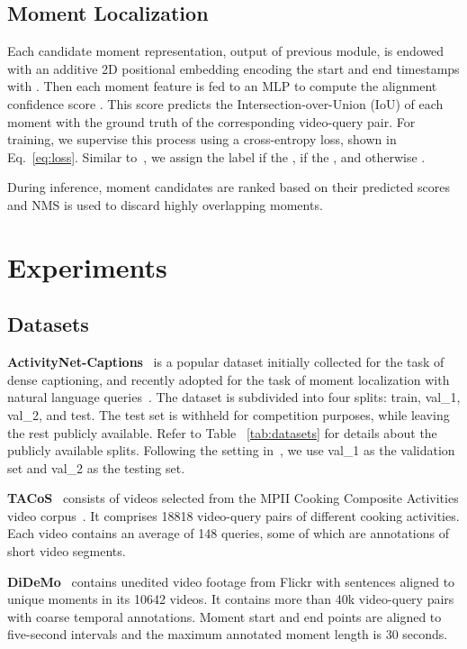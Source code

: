 \documentclass[10pt,twocolumn,letterpaper]{article}
\begin{document}
\subsection{Moment Localization}\label{subsec: Loc}
Each candidate moment representation, output of previous module, is endowed with an additive 2D positional embedding encoding the start and end timestamps  with . Then each moment feature is fed to an MLP to compute the alignment confidence score . This score predicts the Intersection-over-Union (IoU) of each moment with the ground truth of the corresponding video-query pair. For training, we supervise this process using a cross-entropy loss, shown in Eq.~\ref{eq:loss}. Similar to~\cite{2DTAN_2020_AAAI}, we assign the label  if the ,  if the , and otherwise . 
 
During inference, moment candidates are ranked based on  their predicted scores and NMS is used to discard highly overlapping moments. 
 \section{Experiments}\label{sec: experiments}
\subsection{Datasets} 
\noindent\textbf{ActivityNet-Captions}~\cite{Krishna_2017_ICCV} is a popular  dataset initially collected for the task of dense captioning, and recently adopted for the task of moment localization with natural language queries~\cite{chen_etal_2018_temporally,lin2020moment}. The dataset is subdivided into four splits: train, val\_1,  val\_2, and test. The test set is withheld for competition purposes, while leaving the rest publicly available. Refer to  Table ~\ref{tab:datasets}
for details about the publicly available splits. Following the setting in~\cite{lin2020moment}, we use val\_1 as the validation set and val\_2 as the testing set.

\noindent\textbf{TACoS}~\cite{TACoS_ACL_2013} consists of videos selected from the MPII Cooking Composite Activities video corpus~\cite{rohrbach2012script}. It comprises 18818 video-query pairs of different cooking activities. Each video contains an average of 148 queries, some of which are annotations of short video segments. 

\noindent\textbf{DiDeMo}~\cite{Hendricks_2017_ICCV} contains unedited video footage from Flickr with sentences aligned to unique moments in its 10642 videos. It contains more than 40k video-query pairs with coarse temporal annotations. Moment start and end points are aligned to five-second intervals and the maximum annotated moment length is 30 seconds.
\end{document}
